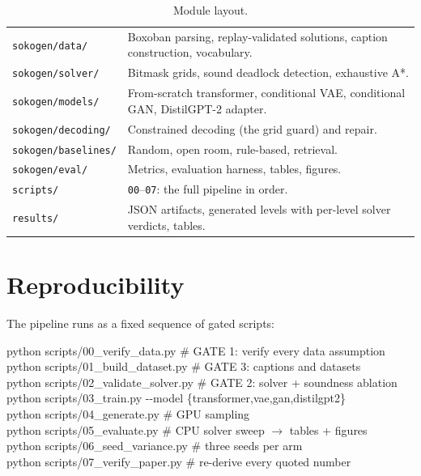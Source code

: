 \documentclass[11pt,a4paper]{report}
\begin{document}
\begin{table}[!htb]
\centering\small
\caption{Module layout.}
\label{tab:layout}
\begin{tabularx}{\textwidth}{@{}l X@{}}
\toprule
\texttt{sokogen/data/} & Boxoban parsing, replay-validated solutions, caption
construction, vocabulary. \\
\texttt{sokogen/solver/} & Bitmask grids, sound deadlock detection, exhaustive
A*. \\
\texttt{sokogen/models/} & From-scratch transformer, conditional VAE,
conditional GAN, DistilGPT-2 adapter. \\
\texttt{sokogen/decoding/} & Constrained decoding (the grid guard) and repair. \\
\texttt{sokogen/baselines/} & Random, open room, rule-based, retrieval. \\
\texttt{sokogen/eval/} & Metrics, evaluation harness, tables, figures. \\
\texttt{scripts/} & \texttt{00}--\texttt{07}: the full pipeline in order. \\
\texttt{results/} & JSON artifacts, generated levels with per-level solver
verdicts, tables. \\
\bottomrule
\end{tabularx}
\end{table}

\section{Reproducibility}

The pipeline runs as a fixed sequence of gated scripts:

\begin{center}
\colorbox{softgrey}{\parbox{0.9\textwidth}{\ttfamily\footnotesize
python scripts/00\_verify\_data.py \hfill \# GATE 1: verify every data assumption\\
python scripts/01\_build\_dataset.py \hfill \# GATE 3: captions and datasets\\
python scripts/02\_validate\_solver.py \hfill \# GATE 2: solver + soundness ablation\\
python scripts/03\_train.py -{}-model \{transformer,vae,gan,distilgpt2\}\\
python scripts/04\_generate.py \hfill \# GPU sampling\\
python scripts/05\_evaluate.py \hfill \# CPU solver sweep $\rightarrow$ tables + figures\\
python scripts/06\_seed\_variance.py \hfill \# three seeds per arm\\
python scripts/07\_verify\_paper.py \hfill \# re-derive every quoted number
}}
\end{center}
\end{document}
